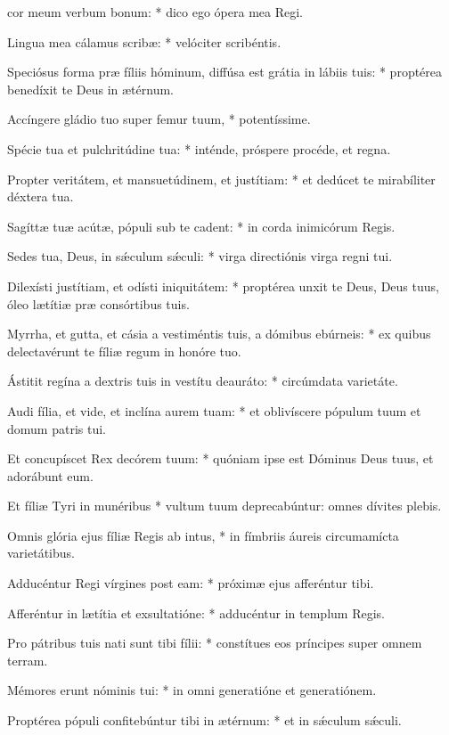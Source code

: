 \begin{psalmus}
    
 cor meum verbum bonum: * dico ego ópera mea Regi.
    
Lingua mea cálamus scribæ: * velóciter scribéntis.

Speciósus forma præ fíliis hóminum, diffúsa est grátia in lábiis tuis: * proptérea benedíxit te Deus in ætérnum.

Accíngere gládio tuo super femur tuum, * potentíssime.

Spécie tua et pulchritúdine tua: * inténde, próspere procéde, et regna.

Propter veritátem, et mansuetúdinem, et justítiam: * et dedúcet te mirabíliter déxtera tua.

Sagíttæ tuæ acútæ, pópuli sub te cadent: * in corda inimicórum Regis.

Sedes tua, Deus, in sǽculum sǽculi: * virga directiónis virga regni tui.

Dilexísti justítiam, et odísti iniquitátem: * proptérea unxit te Deus, Deus tuus, óleo lætítiæ præ consórtibus tuis.

Myrrha, et gutta, et cásia a vestiméntis tuis, a dómibus ebúrneis: * ex quibus delectavérunt te fíliæ regum in honóre tuo.

Ástitit regína a dextris tuis in vestítu deauráto: * circúmdata varietáte.

Audi fília, et vide, et inclína aurem tuam: * et oblivíscere pópulum tuum et domum patris tui.

Et concupíscet Rex decórem tuum: * quóniam ipse est Dóminus Deus tuus, et adorábunt eum.

Et fíliæ Tyri in munéribus * vultum tuum deprecabúntur: omnes dívites plebis.

Omnis glória ejus fíliæ Regis ab intus, * in fímbriis áureis circumamícta varietátibus.

Adducéntur Regi vírgines post eam: * próximæ ejus afferéntur tibi.

Afferéntur in lætítia et exsultatióne: * adducéntur in templum Regis.

Pro pátribus tuis nati sunt tibi fílii: * constítues eos príncipes super omnem terram.

Mémores erunt nóminis tui: * in omni generatióne et generatiónem.

Proptérea pópuli confitebúntur tibi in ætérnum: * et in sǽculum sǽculi.

\end{psalmus}
